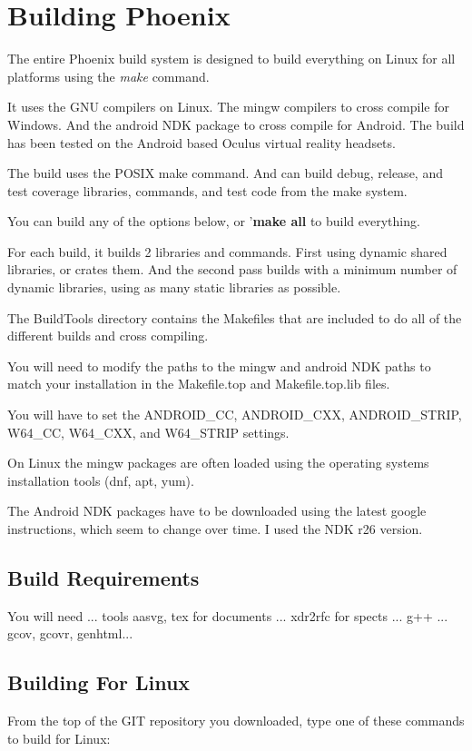 \section{Building Phoenix}
The entire Phoenix build system is designed to build everything
on Linux for all platforms using the \textit{make} command.

It uses the GNU compilers on Linux.
The mingw compilers to cross compile for Windows.
And the android NDK package to cross compile for Android.
The build has been tested on the Android based Oculus virtual
reality headsets.

The build uses the POSIX make command.
And can build debug, release, and test coverage libraries,
commands, and test code from the make system.

You can build any of the options below, or '\textbf{make all}
to build everything.

For each build, it builds 2 libraries and commands.
First using dynamic shared libraries, or crates them.
And the second pass builds with a minimum number
of dynamic libraries, using as many static libraries
as possible.

The BuildTools directory contains the Makefiles
that are included to do all of the different builds
and cross compiling.

You will need to modify the paths to the mingw and
android NDK paths to match your installation in the
Makefile.top and Makefile.top.lib files.

You will have to set the ANDROID\_CC, ANDROID\_CXX, ANDROID\_STRIP,
W64\_CC, W64\_CXX, and W64\_STRIP settings.

On Linux the mingw packages are often loaded using the operating
systems installation tools (dnf, apt, yum).

The Android NDK packages have to be downloaded using the
latest google instructions, which seem to change over time.
I used the NDK r26 version.

\subsection{Build Requirements}
You will need ... tools aasvg,
tex for documents ...
xdr2rfc for spects ...
g++ ...
gcov, gcovr, genhtml...
\subsection{Building For Linux}
From the top of the GIT repository you downloaded,
type one of these commands to build for Linux:

